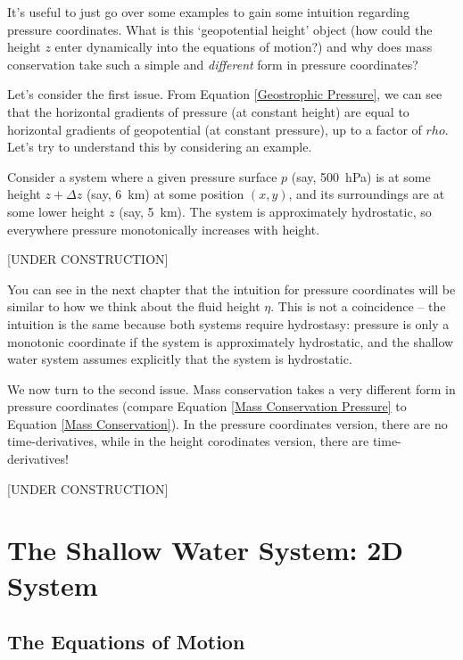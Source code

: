 It's useful to just go over some examples to gain some intuition regarding pressure coordinates. What is this `geopotential height' object (how could the height \(z\) enter dynamically into the equations of motion?) and why does mass conservation take such a simple and \textit{different} form in pressure coordinates?

Let's consider the first issue. From Equation \ref{Geostrophic Pressure}, we can see that the horizontal gradients of pressure (at constant height) are equal to horizontal gradients of geopotential (at constant pressure), up to a factor of \(rho\). Let's try to understand this by considering an example.

Consider a system where a given pressure surface \(p\) (say, \qty{500}{\hecto\pascal}) is at some height \(z+\Delta z\) (say, \qty{6}{\kilo\meter}) at some position \((x,y)\), and its surroundings are at some lower height \(z\) (say, \qty{5}{\kilo\meter}). The system is approximately hydrostatic, so everywhere pressure monotonically increases with height. 

[UNDER CONSTRUCTION]

You can see in the next chapter that the intuition for pressure coordinates will be similar to how we think about the fluid height \(\eta\). This is not a coincidence -- the intuition is the same because both systems require hydrostasy: pressure is only a monotonic coordinate if the system is approximately hydrostatic, and the shallow water system assumes explicitly that the system is hydrostatic.

We now turn to the second issue. Mass conservation takes a very different form in pressure coordinates (compare Equation \ref{Mass Conservation Pressure} to Equation \ref{Mass Conservation}). In the pressure coordinates version, there are no time-derivatives, while in the height corodinates version, there are time-derivatives! 

[UNDER CONSTRUCTION]

\chapter{The Shallow Water System: 2D System}\label{Shallow Water System}

\section{The Equations of Motion}

